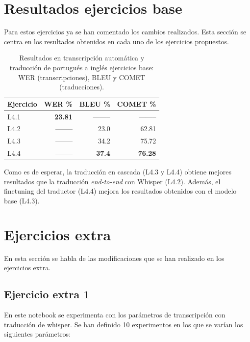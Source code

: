 \documentclass[11pt,spanish,listoffigures,listoftables]{tfgetsinf}
\begin{document}
\section{Resultados ejercicios base}
Para estos ejercicios ya se han comentado los cambios realizados. Esta sección se centra en los resultados obtenidos en cada uno de los ejercicios propuestos.
\begin{table}[H]
\centering
\begin{tabular}{lrrr}
	\toprule
	\textbf{Ejercicio} & \textbf{WER \%} & \textbf{BLEU \%} & \textbf{COMET \%} \\
	\midrule
	L4.1 & \textbf{23.81} & -------- & -------- \\
	L4.2 & -------- & 23.0 & 62.81 \\
	L4.3 & -------- & 34.2 & 75.72 \\
	L4.4 & -------- & \textbf{37.4} & \textbf{76.28} \\
	\bottomrule
\end{tabular}
\caption{Resultados en transcripción automática y traducción de portugués a inglés ejercicios base: \\ WER (transcripciones),  BLEU y COMET (traducciones).}
\label{tab:wer_commet_blue_base}
\end{table}

Como es de esperar, la traducción en cascada (L4.3 y L4.4) obtiene mejores resultados que la traducción \textit{end-to-end} con Whisper (L4.2). Además, el finetuning del traductor (L4.4) mejora los resultados obtenidos con el modelo base (L4.3).

\section{Ejercicios extra}
En esta sección se habla de las modificaciones que se han realizado en los ejercicios extra.

\subsection{Ejercicio extra 1}
En este notebook se experimenta con los parámetros de transcripción con traducción de whisper. Se han definido 10 experimentos en los que se varían los siguientes parámetros:
\end{document}
